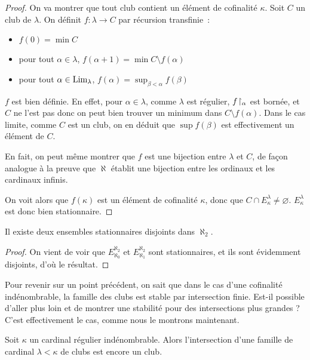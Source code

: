 \begin{proof}
  On va montrer que tout club contient un élément de cofinalité $\kappa$. Soit
  $C$ un club de $\lambda$. On définit $f : \lambda \to C$ par récursion
  transfinie~:
  \begin{itemize}
  \item $f(0) = \min C$
  \item pour tout $\alpha \in \lambda$,
    $f(\alpha + 1) = \min C\setminus f(\alpha)$
  \item pour tout $\alpha \in \operatorname{Lim}_\lambda$,
    $f(\alpha) = \sup_{\beta < \alpha} f(\beta)$
  \end{itemize}

  $f$ est bien définie. En effet, pour $\alpha \in \lambda$, comme $\lambda$ est
  régulier, $f\!\upharpoonright_{\alpha}$ est bornée, et $C$ ne l'est pas donc on peut bien
  trouver un minimum dans $C\setminus f(\alpha)$. Dans le cas limite, comme $C$
  est un club, on en déduit que $\sup f(\beta)$ est effectivement un élément de
  $C$.

  En fait, on peut même montrer que $f$ est une bijection entre $\lambda$ et
  $C$, de façon analogue à la preuve que $\aleph$ établit une bijection entre
  les ordinaux et les cardinaux infinis.

  On voit alors que $f(\kappa)$ est un élément de cofinalité $\kappa$, donc que
  $C\cap E_\kappa^\lambda \neq \varnothing$. $E_\kappa^\lambda$ est donc bien
  stationnaire.
\end{proof}

\begin{corollary}\label{cor.al2.deuxdis}
  Il existe deux ensembles stationnaires disjoints dans $\aleph_2$.
\end{corollary}

\begin{proof}
  On vient de voir que $E_{\aleph_0}^{\aleph_2}$ et $E_{\aleph_1}^{\aleph_2}$ sont
  stationnaires, et ils sont évidemment disjoints, d'où le résultat.
\end{proof}

Pour revenir sur un point précédent, on sait que dans le cas d'une cofinalité
indénombrable, la famille des clubs est stable par intersection finie. Est-il
possible d'aller plus loin et de montrer une stabilité pour des intersections
plus grandes ? C'est effectivement le cas, comme nous le montrons maintenant.

\begin{proposition}\label{prop.inter.club.k}
  Soit $\kappa$ un cardinal régulier indénombrable. Alors l'intersection d'une
  famille de cardinal $\lambda < \kappa$ de clubs est encore un club.
\end{proposition}

